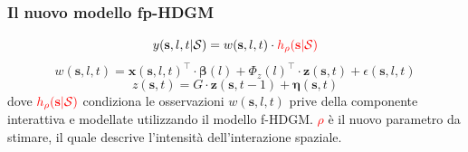 \begin{frame}
	\frametitle{Il nuovo modello fp-HDGM}
	\centering
	\begin{equation*}
		y(\mathbf{s}, l, t|\mathcal{S}) = w(\mathbf{s}, l, t)\cdot\textcolor{red}{h_\rho(\mathbf{s}|\mathcal{S})}
	\end{equation*}
	\begin{equation*}
		w(\mathbf{s}, l, t) = \mathbf{x}(\mathbf{s}, l, t)^\top\cdot\boldsymbol{\beta}(l) + \Phi_z(l)^\top\cdot \mathbf{z}(\mathbf{s}, t) + \epsilon(\mathbf{s}, l, t)
	\end{equation*}
	\begin{equation*}
		z(\mathbf{s}, t) = G\cdot\mathbf{z}(\mathbf{s}, t-1) + \boldsymbol{\eta}(\mathbf{s}, t)
	\end{equation*}
	\newline
	\justifying
	dove $\textcolor{red}{h_\rho(\mathbf{s}|\mathcal{S})}$ condiziona le osservazioni $w(\mathbf{s}, l, t)$ prive della componente interattiva e modellate utilizzando il modello f-HDGM. \textcolor{red}{$\rho$} è il nuovo parametro da stimare, il quale descrive l'intensità dell'interazione spaziale.
\end{frame}

